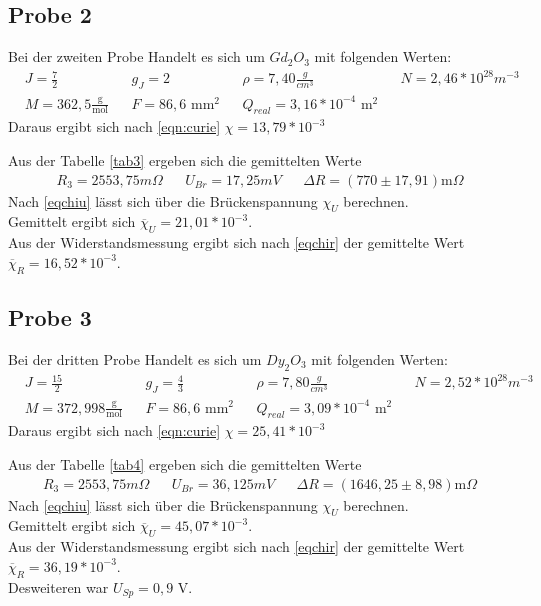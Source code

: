 \subsection{Probe 2}
Bei der zweiten Probe Handelt es sich um $Gd_2O_3$ mit folgenden Werten\cite{tafel}:
\begin{align*}
&J=\frac72&
&g_J=2&
&\rho=7,40\frac{g}{cm^3}&
&N=2,46*10^{28}m^{-3}&\\
&M=362,5\frac{\text{g}}{\text{mol}}&
&F=86,6\text{ mm$^2$}&
&Q_{real}=3,16*10^{-4}\text{ m}^2&
\end{align*}
Daraus ergibt sich nach \eqref{eqn:curie}
$\chi=13,79*10^{-3}$

Aus der Tabelle \ref{tab3} ergeben sich die gemittelten Werte
\begin{align*}
&R_3=2553,75m\Omega&
&U_{Br}=17,25mV&
&\Delta R=(770\pm17,91)\text{m}\Omega&
\end{align*}
Nach \eqref{eqchiu} lässt sich über die Brückenspannung
$\chi_U$
berechnen.\\ Gemittelt ergibt sich $\overline\chi_U=21,01*10^{-3}$.
\\
Aus der Widerstandsmessung ergibt sich nach \eqref{eqchir} der gemittelte Wert
$\overline\chi_R=16,52*10^{-3}$.



\subsection{Probe 3}
Bei der dritten Probe Handelt es sich um $Dy_2O_3$ mit folgenden Werten\cite{tafel}:
\begin{align*}
&J=\frac{15}{2}&
&g_J=\frac43&
&\rho=7,80\frac{g}{cm^3}&
&N=2,52*10^{28}m^{-3}&\\
&M=372,998\frac{\text{g}}{\text{mol}}&
&F=86,6\text{ mm$^2$}&
&Q_{real}=3,09*10^{-4}\text{ m}^2&
\end{align*}
Daraus ergibt sich nach \eqref{eqn:curie} 
$\chi=25,41*10^{-3}$

Aus der Tabelle \ref{tab4} ergeben sich die gemittelten Werte
\begin{align*}
&R_3=2553,75m\Omega&
&U_{Br}=36,125mV&
&\Delta R=(1646,25\pm8,98)\text{m}\Omega&
\end{align*}
Nach \eqref{eqchiu} lässt sich über die Brückenspannung
$\chi_U$
berechnen. \\Gemittelt ergibt sich $\overline\chi_U=45,07*10^{-3}$.
\\
Aus der Widerstandsmessung ergibt sich nach \eqref{eqchir} der gemittelte Wert
$\overline\chi_R=36,19*10^{-3}$.\\
Desweiteren war $U_{Sp}=0,9\text{ V}$.
